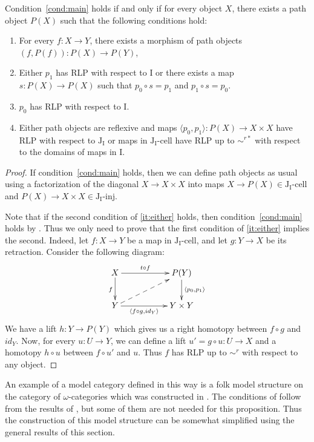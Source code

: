 \documentclass{tac}
\theoremstyle{definition}
\newcommand{\I}{\mathrm{I}}
\newcommand{\J}{\mathrm{J}}
\newcommand{\class}[2]{#1\text{-}\mathrm{#2}}
\newcommand{\Iinj}[1][\I]{\class{#1}{inj}}
\newcommand{\Icell}[1][\I]{\class{#1}{cell}}
\newcommand{\Jinj}[1][]{\Iinj[\J#1]}
\newcommand{\Jcell}[1][]{\Icell[\J#1]}
\begin{document}
\begin{prop}
Condition~\eqref{cond:main} holds if and only if for every object $X$,
there exists a path object $P(X)$ such that the following conditions hold:
\begin{enumerate}
\item For every $f : X \to Y$, there exists a morphism of path objects $(f,P(f)) : P(X) \to P(Y)$,
\item Either $p_1$ has RLP with respect to $\I$ or there exists a map $s : P(X) \to P(X)$ such that $p_0 \circ s = p_1$ and $p_1 \circ s = p_0$.
\item $p_0$ has RLP with respect to $\I$.
\item \label{it:either} Either path objects are reflexive and maps $\langle p_0, p_1 \rangle : P(X) \to X \times X$ have RLP with respect to $\J_\I$
or maps in $\Jcell[_\I]$ have RLP up to $\sim^{r*}$ with respect to the domains of maps in $\I$.
\end{enumerate}
\end{prop}
\begin{proof}
If condition~\eqref{cond:main} holds, then we can define path objects as usual using a factorization
of the diagonal $X \to X \times X$ into maps $X \to P(X) \in \Jcell[_\I]$ and $P(X) \to X \times X \in \Jinj[_\I]$.

Note that if the second condition of \eqref{it:either} holds, then condition~\eqref{cond:main} holds by .
Thus we only need to prove that the first condition of \eqref{it:either} implies the second.
Indeed, let $f : X \to Y$ be a map in $\Jcell[_\I]$, and let $g : Y \to X$ be its retraction.
Consider the following diagram:
\[ \xymatrix{ X \ar[rr]^-{t \circ f} \ar[d]_f & & P(Y) \ar[d]^{\langle p_0, p_1 \rangle} \\
              Y \ar[rr]_-{\langle f \circ g, id_Y \rangle} \ar@{-->}[urr] & & Y \times Y
            } \]
We have a lift $h : Y \to P(Y)$ which gives us a right homotopy between $f \circ g$ and $id_Y$.
Now, for every $u : U \to Y$, we can define a lift $u' = g \circ u : U \to X$ and a homotopy $h \circ u$ between $f \circ u'$ and $u$.
Thus $f$ has RLP up to $\sim^r$ with respect to any object.
\end{proof}

\begin{exmp}
An example of a model category defined in this way is a folk model structure on the category of $\omega$-categories which was constructed in \cite{folk}.
The conditions of  follow from the results of \cite{folk}, but some of them are not needed for this proposition.
Thus the construction of this model structure can be somewhat simplified using the general results of this section.
\end{exmp}
\end{document}
